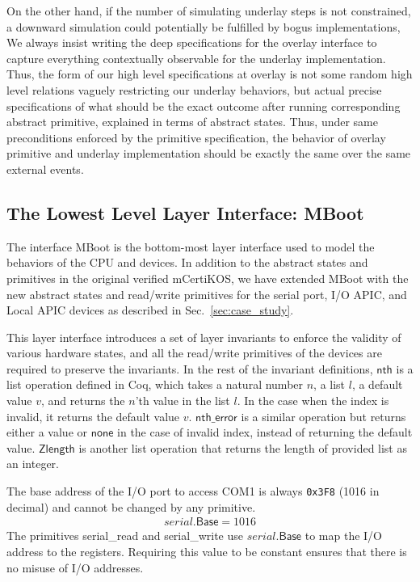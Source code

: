 On the other hand, if the number of simulating underlay steps is not constrained, a
downward simulation could potentially be fulfilled by bogus implementations,  
We always insist writing the deep specifications for the overlay interface to
capture everything contextually observable for the underlay implementation.
Thus, the form of our high level specifications at overlay is not some random
high level relations vaguely restricting our underlay behaviors, but actual
precise specifications of what should be the exact outcome after running
corresponding abstract primitive, explained in terms of abstract states.
Thus, under same preconditions enforced by the primitive specification, the
behavior of overlay primitive and underlay implementation should be exactly
the same over the same external events. 

\subsection{The Lowest Level Layer Interface: MBoot}

The interface MBoot is the bottom-most layer interface used to model the
behaviors of the CPU and devices. In addition to the abstract states and
primitives in the original verified mCertiKOS, we have extended MBoot with the
new abstract states and read/write primitives for the serial port, I/O APIC, and
Local APIC devices as described in Sec.~\ref{sec:case_study}.

This layer interface introduces a set of layer invariants to enforce the
validity of various hardware states, and all the read/write primitives of the
devices are required to preserve the invariants. In the rest of the invariant
definitions, $\textsf{nth}$ is a list operation defined in Coq, which takes a
natural number $n$, a list $l$, a default value $v$, and returns the $n$'th
value in the list $l$. In the case when the index is invalid, it returns the
default value $v$. $\textsf{nth\_error}$ is a similar operation but returns
either a value or $\textsf{none}$ in the case of invalid index, instead of
returning the default value. $\textsf{Zlength}$ is another list operation that
returns the length of provided list as an integer.

\begin{invariant}
The base address of the I/O port to access \textsf{COM1} is always
\texttt{0x3F8} (1016 in decimal) and cannot be changed by any primitive.
\begin{align*}
serial.\textsf{Base} = 1016
\end{align*}
\noindent{}\textnormal{The primitives \textsf{serial\_read} and
	\textsf{serial\_write} use $serial.\textsf{Base}$ to map the I/O address to the
	registers. Requiring this value to be constant ensures that there is no misuse
	of I/O addresses.}
\end{invariant}

